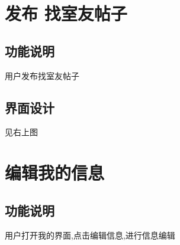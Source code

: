 \section{发布 找室友帖子}

\subsection{功能说明}
用户发布找室友帖子
\subsection{界面设计}
见右上图
\newpage

\section{编辑我的信息}

\subsection{功能说明}
用户打开我的界面,点击编辑信息,进行信息编辑
